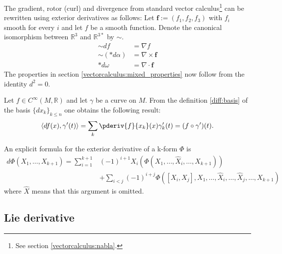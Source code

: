     \begin{remark}[$\dag$]\label{diff:vector_calculus}
        The gradient, rotor (curl) and divergence from standard vector calculus\footnote{See section \ref{vectorcalculus:nabla}.} can be rewritten using exterior derivatives as follows: Let $\mathbf{f} := (f_1,f_2,f_3)$ with $f_i$ smooth for every $i$ and let $f$ be a smooth function. Denote the canonical isomorphism between $\mathbb{R}^3$ and $\mathbb{R}^{3*}$ by $\sim$.
        \begin{align}
            \sim df &= \nabla f \\
            \sim (\ast d\alpha) &= \nabla\times\mathbf{f} \\
            \ast d\omega &= \nabla\cdot\mathbf{f}
        \end{align}
        The properties in section \ref{vectorcalculus:mixed_properties} now follow from the identity $d^2 = 0$.
    \end{remark}

    \begin{example}
        Let $f\in C^\infty(M, \mathbb{R})$ and let $\gamma$ be a curve on $M$. From the definition \ref{diff:basis} of the basis $\{dx_k\}_{k\leq n}$ one obtains the following result:
        \begin{gather}
            \langle df(x), \gamma'(t) \rangle = \sum_k \pderiv{f}{x_k}(x)\gamma_k'(t) = (f\circ\gamma')(t).
        \end{gather}
    \end{example}

    \begin{example}
        An explicit formula for the exterior derivative of a k-form $\Phi$ is
        \begin{align}
            d\Phi(X_1,\ldots, X_{k+1}) = \sum_{i=1}^{k+1} &(-1)^{i+1} X_i(\Phi(X_1,\ldots, \hat{X}_i,\ldots, X_{k+1}))\nonumber\\
            \label{diff:k_form_exterior_derivative}
            &+\sum_{i<j} (-1)^{i+j}\Phi([X_i, X_j], X_1,\ldots, \hat{X}_i,\ldots, \hat{X}_j,\ldots, X_{k+1})
        \end{align}
        where $\hat{X}$ means that this argument is omitted.
    \end{example}

\subsection{Lie derivative}

